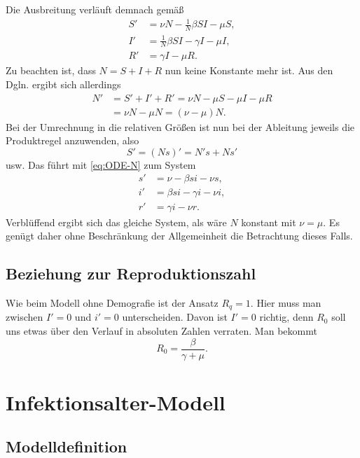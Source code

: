\documentclass[a4paper,10pt,fleqn,twocolumn,twoside,dvipdfmx]{scrartcl}
\numberwithin{equation}{section}
\begin{document}
Die Ausbreitung verläuft demnach gemäß%
\begin{align}
S' &= \nu N - \tfrac{1}{N}\beta SI - \mu S,\\
I' &= \tfrac{1}{N}\beta SI - \gamma I - \mu I,\\
R' &= \gamma I - \mu R.
\end{align}
Zu beachten ist, dass $N=S+I+R$ nun keine Konstante mehr
ist. Aus den Dgln. ergibt sich allerdings
\begin{equation}\label{eq:ODE-N}
\begin{split}
N' &= S'+I'+R' = \nu N - \mu S - \mu I - \mu R\\
&= \nu N - \mu N = (\nu-\mu)N.
\end{split}
\end{equation}
Bei der Umrechnung in die relativen Größen ist nun bei der
Ableitung jeweils die Produktregel anzuwenden, also
\[S' = (Ns)' = N's + Ns'\]
usw. Das führt mit \eqref{eq:ODE-N} zum System
\begin{align}
s' &= \nu - \beta si - \nu s,\\
i' &= \beta si - \gamma i - \nu i,\\
r' &= \gamma i - \nu r.
\end{align}
Verblüffend ergibt sich das gleiche System, als wäre
$N$ konstant mit $\nu = \mu$. Es genügt daher ohne Beschränkung
der Allgemeinheit die Betrachtung dieses Falls.

\subsection{Beziehung zur Reproduktionszahl}

Wie beim Modell ohne Demografie ist der Ansatz $R_q = 1$.
Hier muss man zwischen $I'=0$ und $i'=0$ unterscheiden. Davon ist
$I'=0$ richtig, denn $R_0$ soll uns etwas über den Verlauf in
absoluten Zahlen verraten. Man bekommt
\begin{equation}
R_0 = \frac{\beta}{\gamma+\mu}.
\end{equation}

\section{Infektionsalter-Modell}

\subsection{Modelldefinition}
\end{document}
